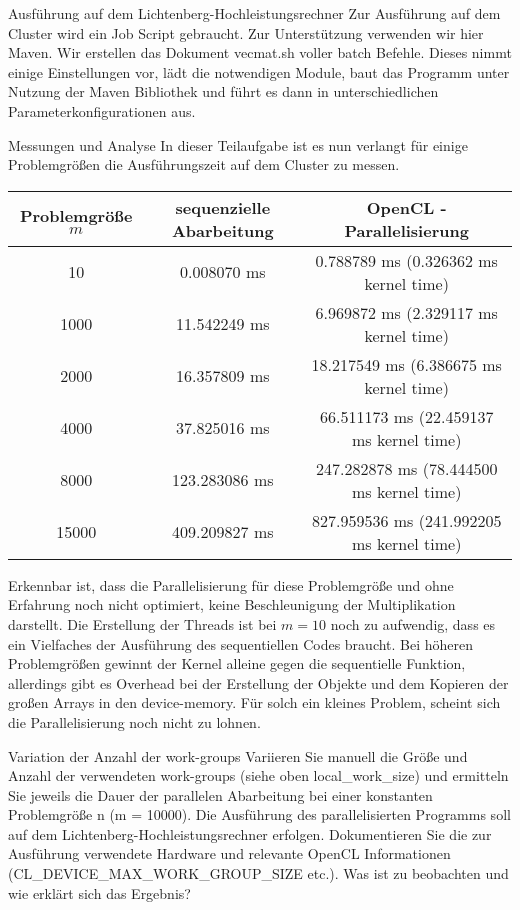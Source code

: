 \documentclass[
ngerman,
subtask=ruled %
]{tudaexercise}
\begin{document}
	
	\begin{task}{Ausführung auf dem Lichtenberg-Hochleistungsrechner} 
		Zur Ausführung auf dem Cluster wird ein Job Script gebraucht. Zur Unterstützung verwenden wir hier Maven.
		Wir erstellen das Dokument vecmat.sh voller batch Befehle.
		Dieses nimmt einige Einstellungen vor, lädt die notwendigen Module, baut das Programm unter Nutzung der Maven Bibliothek und führt es dann in unterschiedlichen Parameterkonfigurationen aus.
	\end{task}

	\begin{task}{Messungen und Analyse} 
		In dieser Teilaufgabe ist es nun verlangt für einige Problemgrößen die Ausführungszeit auf dem Cluster zu messen.
		
		\begin{tabular}{|c|c|c|}
			\hline
			Problemgröße $m$ & sequenzielle Abarbeitung & OpenCL - Parallelisierung \\
			\hline
			10 & 0.008070 ms & 0.788789 ms (0.326362 ms kernel time) \\
			\hline
			1000 & 11.542249 ms & 6.969872 ms (2.329117 ms kernel time) \\
			\hline
			2000 & 16.357809 ms & 18.217549 ms (6.386675 ms kernel time) \\
			\hline
			4000 & 37.825016 ms & 66.511173 ms (22.459137 ms kernel time) \\
			\hline
			8000 & 123.283086 ms & 247.282878 ms (78.444500 ms kernel time) \\
			\hline
			15000 & 409.209827 ms & 827.959536 ms (241.992205 ms kernel time) \\
			\hline
		\end{tabular}
	
		Erkennbar ist, dass die Parallelisierung für diese Problemgröße und ohne Erfahrung noch nicht optimiert, keine Beschleunigung der Multiplikation darstellt.
		Die Erstellung der Threads ist bei $m=10$ noch zu aufwendig, dass es ein Vielfaches der Ausführung des sequentiellen Codes braucht.
		Bei höheren Problemgrößen gewinnt der Kernel alleine gegen die sequentielle Funktion, allerdings gibt es Overhead bei der Erstellung der Objekte und dem Kopieren der großen Arrays in den device-memory.
		Für solch ein kleines Problem, scheint sich die Parallelisierung noch nicht zu lohnen.
	\end{task}

	\begin{task} {Variation der Anzahl der work-groups}
		Variieren Sie manuell die Größe und Anzahl der verwendeten work-groups (siehe oben local\_work\_size) und ermitteln
		Sie jeweils die Dauer der parallelen Abarbeitung bei einer konstanten Problemgröße n (m = 10000). Die Ausführung
		des parallelisierten Programms soll auf dem Lichtenberg-Hochleistungsrechner erfolgen. Dokumentieren Sie die zur
		Ausführung verwendete Hardware und relevante OpenCL Informationen (CL\_DEVICE\_MAX\_WORK\_GROUP\_SIZE etc.).
		Was ist zu beobachten und wie erklärt sich das Ergebnis?
	\end{task}

	
\end{document}
